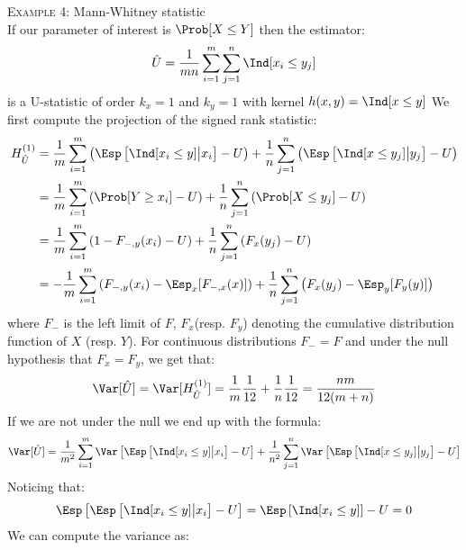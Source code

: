 \documentclass[12pt]{article}
\begin{document}
\textsc{Example 4}: Mann-Whitney statistic \\
If our parameter of interest is \(\Prob[X \leq Y]\) then the estimator:
\begin{align*}
\hat{U} = \frac{1}{mn} \sum_{i=1}^m \sum_{j=1}^n \Ind[x_i \leq y_j]
\end{align*}
is a U-statistic of order \(k_x=1\) and \(k_y=1\) with kernel \(h(x,y)=\Ind[x \leq y]\)
We first compute the \Hajek projection of the signed rank statistic:
\begin{align*}
H_{\hat{U}}^{(1)} &= \frac{1}{m} \sum_{i=1}^m \left( \Esp\left[\Ind[x_i \leq y] \big| x_i\right] - U \right)
+ \frac{1}{n} \sum_{j=1}^n \left( \Esp\left[\Ind[x \leq y_j] \big| y_j\right] - U \right) \\
&= \frac{1}{m} \sum_{i=1}^m \left( \Prob[Y \geq x_i] - U \right)
+ \frac{1}{n} \sum_{j=1}^n \left( \Prob[X \leq y_j] - U \right) \\
&= \frac{1}{m} \sum_{i=1}^m \left( 1 - F_{-,y}(x_i) - U \right)
+ \frac{1}{n} \sum_{j=1}^n \left( F_x(y_j) - U \right) \\
&= - \frac{1}{m} \sum_{i=1}^m \left( F_{-,y}(x_i) - \Esp_x[ F_{-,x}(x) ] \right)
+ \frac{1}{n} \sum_{j=1}^n \left( F_x(y_j) - \Esp_y[ F_y(y) ] \right) 
\end{align*}
where \(F_{-}\) is the left limit of \(F\), \(F_x\)(resp. \(F_y\))
denoting the cumulative distribution function of \(X\)
(resp. \(Y\)). For continuous distributions \(F_{-}=F\) and under the
null hypothesis that \(F_x=F_y\), we get that:
\begin{align*}
\Var[\hat{U}] = \Var[H_{\hat{U}}^{(1)}] = \frac{1}{m} \frac{1}{12} + \frac{1}{n} \frac{1}{12} = \frac{nm}{12(m+n)}
\end{align*}
If we are not under the null we end up with the formula:
\begin{align*}
\Var[\hat{U}] = \frac{1}{m^2} \sum_{i=1}^m \Var\left[ \Esp\left[ \Ind[x_i \leq y] \big| x_i\right] - U\right] + \frac{1}{n^2} \sum_{j=1}^n \Var\left[ \Esp\left[ \Ind[x \leq y_j] \big| y_j\right] - U\right]
\end{align*}
Noticing that:
\begin{align*}
\Esp\left[ \Esp\left[ \Ind[x_i \leq y] \big| x_i\right] - U\right] = \Esp\left[ \Ind[x_i \leq y]\right] - U = 0 
\end{align*}
We can compute the variance as:
\end{document}
